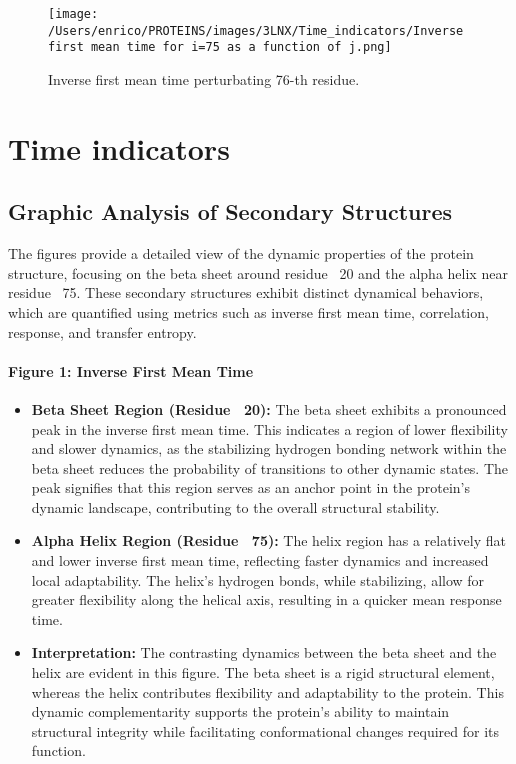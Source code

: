 \documentclass[English, Lau, oneside]{sapthesis}
\begin{document}
\begin{itemize}
\begin{figure}[h!]
    \centering
    \texttt{[image: /Users/enrico/PROTEINS/images/3LNX/Time\_indicators/Inverse first mean time for i=75 as a function of j.png]}
    \caption{Inverse first mean time perturbating 76-th residue.}
\end{figure}


\section*{Time indicators}
\subsection*{Graphic Analysis of Secondary Structures}

The figures provide a detailed view of the dynamic properties of the protein structure, focusing on the beta sheet around residue ~20 and the alpha helix near residue ~75. These secondary structures exhibit distinct dynamical behaviors, which are quantified using metrics such as inverse first mean time, correlation, response, and transfer entropy.

\paragraph{Figure 1: Inverse First Mean Time}
\begin{itemize}
    \item \textbf{Beta Sheet Region (Residue ~20):} The beta sheet exhibits a pronounced peak in the inverse first mean time. This indicates a region of lower flexibility and slower dynamics, as the stabilizing hydrogen bonding network within the beta sheet reduces the probability of transitions to other dynamic states. The peak signifies that this region serves as an anchor point in the protein’s dynamic landscape, contributing to the overall structural stability.
    \item \textbf{Alpha Helix Region (Residue ~75):} The helix region has a relatively flat and lower inverse first mean time, reflecting faster dynamics and increased local adaptability. The helix’s hydrogen bonds, while stabilizing, allow for greater flexibility along the helical axis, resulting in a quicker mean response time.
    \item \textbf{Interpretation:} The contrasting dynamics between the beta sheet and the helix are evident in this figure. The beta sheet is a rigid structural element, whereas the helix contributes flexibility and adaptability to the protein. This dynamic complementarity supports the protein's ability to maintain structural integrity while facilitating conformational changes required for its function.
\end{itemize}


\end{itemize}
\end{document}
